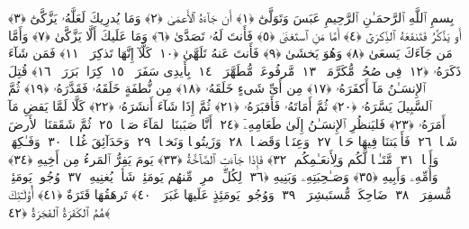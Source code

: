 
  
    
  
    
    

\nopagebreak
  بِسمِ ٱللَّهِ ٱلرَّحمَـٰنِ ٱلرَّحِيمِ
  عَبَسَ وَتَوَلَّىٰٓ ﴿١﴾
 أَن جَآءَهُ ٱلأَعمَىٰ ﴿٢﴾
 وَمَا يُدرِيكَ لَعَلَّهُۥ يَزَّكَّىٰٓ ﴿٣﴾
 أَو يَذَّكَّرُ فَتَنفَعَهُ ٱلذِّكرَىٰٓ ﴿٤﴾
 أَمَّا مَنِ ٱستَغنَىٰ ﴿٥﴾
 فَأَنتَ لَهُۥ تَصَدَّىٰ ﴿٦﴾
 وَمَا عَلَيكَ أَلَّا يَزَّكَّىٰ ﴿٧﴾
 وَأَمَّا مَن جَآءَكَ يَسعَىٰ ﴿٨﴾
 وَهُوَ يَخشَىٰ ﴿٩﴾
 فَأَنتَ عَنهُ تَلَهَّىٰ ﴿١٠﴾
 كَلَّآ إِنَّهَا تَذكِرَةٌۭ ﴿١١﴾
 فَمَن شَآءَ ذَكَرَهُۥ ﴿١٢﴾
 فِى صُحُفٍۢ مُّكَرَّمَةٍۢ ﴿١٣﴾
 مَّرفُوعَةٍۢ مُّطَهَّرَةٍۭ ﴿١٤﴾
 بِأَيدِى سَفَرَةٍۢ ﴿١٥﴾
 كِرَامٍۭ بَرَرَةٍۢ ﴿١٦﴾
 قُتِلَ ٱلإِنسَـٰنُ مَآ أَكفَرَهُۥ ﴿١٧﴾
 مِن أَىِّ شَىءٍ خَلَقَهُۥ ﴿١٨﴾
 مِن نُّطفَةٍ خَلَقَهُۥ فَقَدَّرَهُۥ ﴿١٩﴾
 ثُمَّ ٱلسَّبِيلَ يَسَّرَهُۥ ﴿٢٠﴾
 ثُمَّ أَمَاتَهُۥ فَأَقبَرَهُۥ ﴿٢١﴾
 ثُمَّ إِذَا شَآءَ أَنشَرَهُۥ ﴿٢٢﴾
 كَلَّا لَمَّا يَقضِ مَآ أَمَرَهُۥ ﴿٢٣﴾
 فَليَنظُرِ ٱلإِنسَـٰنُ إِلَىٰ طَعَامِهِۦٓ ﴿٢٤﴾
 أَنَّا صَبَبنَا ٱلمَآءَ صَبًّۭا ﴿٢٥﴾
 ثُمَّ شَقَقنَا ٱلأَرضَ شَقًّۭا ﴿٢٦﴾
 فَأَنۢبَتنَا فِيهَا حَبًّۭا ﴿٢٧﴾
 وَعِنَبًۭا وَقَضبًۭا ﴿٢٨﴾
 وَزَيتُونًۭا وَنَخلًۭا ﴿٢٩﴾
 وَحَدَآئِقَ غُلبًۭا ﴿٣٠﴾
 وَفَـٰكِهَةًۭ وَأَبًّۭا ﴿٣١﴾
 مَّتَـٰعًۭا لَّكُم وَلِأَنعَـٰمِكُم ﴿٣٢﴾
 فَإِذَا جَآءَتِ ٱلصَّآخَّةُ ﴿٣٣﴾
 يَومَ يَفِرُّ ٱلمَرءُ مِن أَخِيهِ ﴿٣٤﴾
 وَأُمِّهِۦ وَأَبِيهِ ﴿٣٥﴾
 وَصَـٰحِبَتِهِۦ وَبَنِيهِ ﴿٣٦﴾
 لِكُلِّ ٱمرِئٍۢ مِّنهُم يَومَئِذٍۢ شَأنٌۭ يُغنِيهِ ﴿٣٧﴾
 وُجُوهٌۭ يَومَئِذٍۢ مُّسفِرَةٌۭ ﴿٣٨﴾
 ضَاحِكَةٌۭ مُّستَبشِرَةٌۭ ﴿٣٩﴾
 وَوُجُوهٌۭ يَومَئِذٍ عَلَيهَا غَبَرَةٌۭ ﴿٤٠﴾
 تَرهَقُهَا قَتَرَةٌ ﴿٤١﴾
 أُو۟لَـٰٓئِكَ هُمُ ٱلكَفَرَةُ ٱلفَجَرَةُ ﴿٤٢﴾
 
